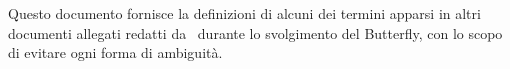 Questo documento fornisce la definizioni di alcuni dei termini apparsi in altri documenti allegati redatti 
da \gruppo\ durante lo svolgimento del  Butterfly, con
lo scopo di evitare ogni forma di ambiguit\`a.